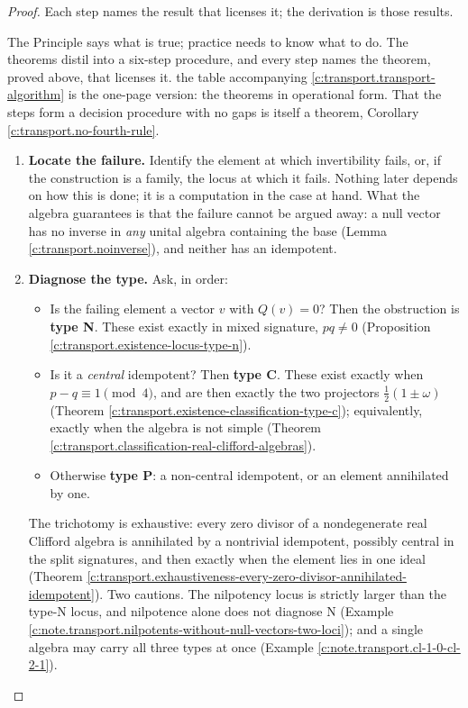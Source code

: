 \documentclass[11pt]{article}
\theoremstyle{definition}
\theoremstyle{plain}
\begin{document}
\begin{proof}
Each step names the result that licenses it; the derivation is those results.

The Principle says what is true; practice needs to know what to do. The theorems distil into a six-step procedure, and every step names the theorem, proved above, that licenses it. the table accompanying \ref{c:transport.transport-algorithm} is the one-page version: the theorems in operational form. That the steps form a decision procedure with no gaps is itself a theorem, Corollary \ref{c:transport.no-fourth-rule}.




\begin{enumerate}
\item[\textbf{Step 1.}] \textbf{Locate the failure.} Identify the element at which invertibility fails, or, if the construction is a family, the locus at which it fails. Nothing later depends on how this is done; it is a computation in the case at hand. What the algebra guarantees is that the failure cannot be argued away: a null vector has no inverse in \emph{any} unital algebra containing the base (Lemma \ref{c:transport.noinverse}), and neither has an idempotent.

\item[\textbf{Step 2.}] \textbf{Diagnose the type.} Ask, in order:
  \begin{itemize}
  \item Is the failing element a vector $v$ with $Q(v) = 0$? Then the obstruction is \textbf{type N}. These exist exactly in mixed signature, $pq \neq 0$ (Proposition \ref{c:transport.existence-locus-type-n}).
  \item Is it a \emph{central} idempotent? Then \textbf{type C}. These exist exactly when $p - q \equiv 1 \pmod 4$, and are then exactly the two projectors $\tfrac12(1 \pm \omega)$ (Theorem \ref{c:transport.existence-classification-type-c}); equivalently, exactly when the algebra is not simple (Theorem \ref{c:transport.classification-real-clifford-algebras}).
  \item Otherwise \textbf{type P}: a non-central idempotent, or an element annihilated by one.
  \end{itemize}
  The trichotomy is exhaustive: every zero divisor of a nondegenerate real Clifford algebra is annihilated by a nontrivial idempotent, possibly central in the split signatures, and then exactly when the element lies in one ideal (Theorem \ref{c:transport.exhaustiveness-every-zero-divisor-annihilated-idempotent}). Two cautions. The nilpotency locus is strictly larger than the type-N locus, and nilpotence alone does not diagnose N (Example \ref{c:note.transport.nilpotents-without-null-vectors-two-loci}); and a single algebra may carry all three types at once (Example \ref{c:note.transport.cl-1-0-cl-2-1}).


\end{enumerate}
\end{proof}
\end{document}
